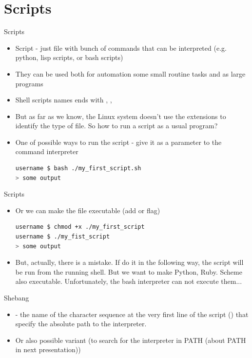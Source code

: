 \documentclass[usenames,dvipsnames,10pt,aspectratio=169]{beamer}
\begin{document}
\section{Scripts}

\begin{frame}[fragile]{Scripts}
    \begin{itemize}
        \item Script - just file with bunch of commands that can be interpreted (e.g. python, lisp scripts, or bash scripts)
        \item They can be used both for automation some small routine tasks and as large programs
        \item Shell scripts names ends with , , 
        \item But as far as we know, the Linux system doesn't use the extensions to identify the type of file. So how to run a script as a usual program?
        \item One of possible ways to run the script - give it as a parameter to the command interpreter
        \begin{lstlisting}[language=bash, style=shellstyle]
username $ bash ./my_first_script.sh
> some output
        \end{lstlisting}
    \end{itemize}
\end{frame}

\begin{frame}[fragile]{Scripts}
    \begin{itemize}
        \item Or we can make the file executable (add  or  flag)
        \begin{lstlisting}[language=bash, style=shellstyle]
username $ chmod +x ./my_first_script
username $ ./my_fist_script
> some output
        \end{lstlisting}
        \item But, actually, there is a mistake. If do it in the following way, the script will be run from the running shell. But we want to make Python, Ruby. Scheme also executable. Unfortunately, the bash interpreter can not execute them...
    \end{itemize}
\end{frame}

\begin{frame}{Shebang}
    \begin{itemize}
        \item {} - the name of the character sequence at the very first line of the script () that specify the absolute path to the interpreter.
        
        \item Or also possible variant (to search for the interpreter in PATH (about PATH in next presentation))
        
    \end{itemize}
\end{frame}
\end{document}
